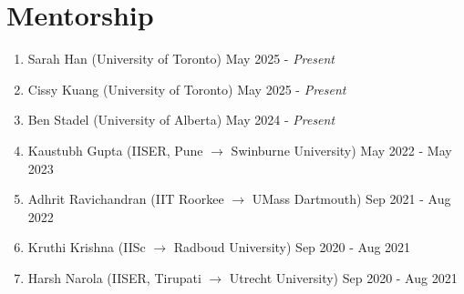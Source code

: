 	
		\section{Mentorship}
		\begin{enumerate}[leftmargin=*]
			\item Sarah Han (University of Toronto) \hfill May 2025 - \textit{Present}
			\item Cissy Kuang (University of Toronto) \hfill May 2025 - \textit{Present}
			\item Ben Stadel (University of Alberta) \hfill May 2024 - \textit{Present}
			\item Kaustubh Gupta (IISER, Pune $\rightarrow$ Swinburne University) \hfill May 2022 - May 2023
			\item Adhrit Ravichandran (IIT Roorkee $\rightarrow$ UMass Dartmouth) \hfill Sep 2021 - Aug 2022
			\item Kruthi Krishna (IISc $ \rightarrow $ Radboud University) \hfill Sep 2020 - Aug 2021
			\item Harsh Narola (IISER, Tirupati $ \rightarrow $ Utrecht University) \hfill Sep 2020 - Aug 2021
		\end{enumerate}
		

